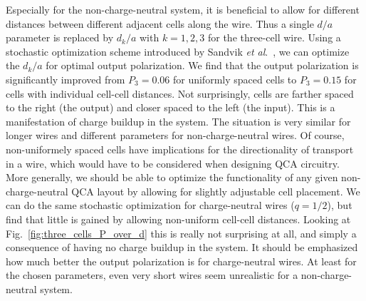 Especially for the non-charge-neutral system, it is beneficial to allow for
different distances between different adjacent cells along the wire. Thus a
single $d/a$ parameter is replaced by $d_k/a$ with $k = 1,2,3$ for the
three-cell wire. Using a stochastic optimization scheme introduced by Sandvik
\emph{et al}.\ \cite{Sandvik2007}, we can optimize the $d_k/a$ for optimal
output polarization. We find that the output polarization is significantly
improved from $P_3 = 0.06$ for uniformly spaced cells to $P_3 = 0.15$ for cells
with individual cell-cell distances. Not surprisingly, cells are farther spaced
to the right (the output) and closer spaced to the left (the input). This is a
manifestation of charge buildup in the system. The situation is very similar for
longer wires and different parameters for non-charge-neutral wires. Of course,
non-uniformely spaced cells have implications for the directionality of
transport in a wire, which would have to be considered when designing QCA
circuitry. More generally, we should be able to optimize the functionality of
any given non-charge-neutral QCA layout by allowing for slightly adjustable cell
placement. We can do the same stochastic optimization for charge-neutral wires
($q=1/2$), but find that little is gained by allowing non-uniform cell-cell
distances. Looking at Fig.~\ref{fig:three_cells_P_over_d} this is really not
surprising at all, and simply a consequence of having no charge buildup in the
system. It should be emphasized how much better the output polarization is for
charge-neutral wires. At least for the chosen parameters, even very short wires
seem unrealistic for a non-charge-neutral system.

